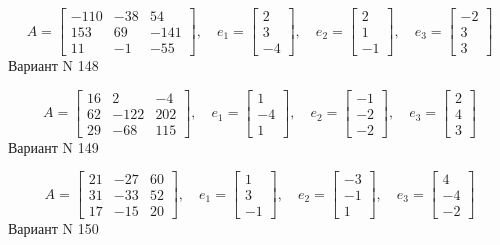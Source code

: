 \documentclass[11pt]{report}
\begin{document}
$$A = \left[\begin{matrix}-110 & -38 & 54\\153 & 69 & -141\\11 & -1 & -55\end{matrix}\right],\quad e_1 = \left[\begin{matrix}2\\3\\-4\end{matrix}\right],\quad e_2 = \left[\begin{matrix}2\\1\\-1\end{matrix}\right],\quad e_3 = \left[\begin{matrix}-2\\3\\3\end{matrix}\right]$$Вариант N 148

$$A = \left[\begin{matrix}16 & 2 & -4\\62 & -122 & 202\\29 & -68 & 115\end{matrix}\right],\quad e_1 = \left[\begin{matrix}1\\-4\\1\end{matrix}\right],\quad e_2 = \left[\begin{matrix}-1\\-2\\-2\end{matrix}\right],\quad e_3 = \left[\begin{matrix}2\\4\\3\end{matrix}\right]$$Вариант N 149

$$A = \left[\begin{matrix}21 & -27 & 60\\31 & -33 & 52\\17 & -15 & 20\end{matrix}\right],\quad e_1 = \left[\begin{matrix}1\\3\\-1\end{matrix}\right],\quad e_2 = \left[\begin{matrix}-3\\-1\\1\end{matrix}\right],\quad e_3 = \left[\begin{matrix}4\\-4\\-2\end{matrix}\right]$$Вариант N 150
\end{document}
